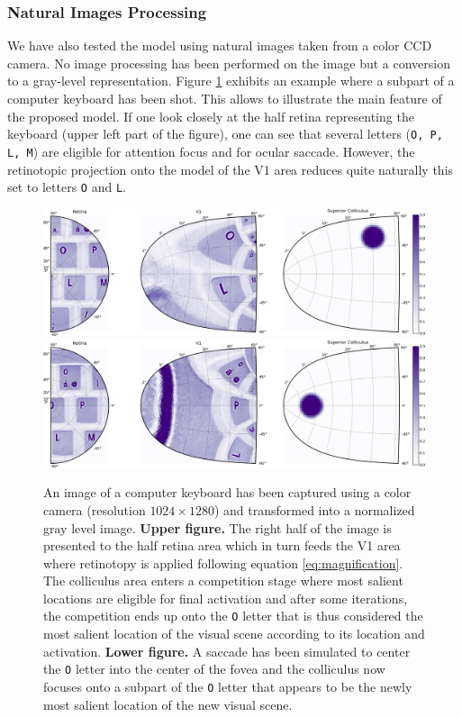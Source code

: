 \subsubsection{Natural Images Processing}
We have also tested the model using natural images taken from a color CCD
camera. No image processing has been performed on the image but a conversion to
a gray-level representation. Figure \ref{fig:colliculus} exhibits an example
where a subpart of a computer keyboard has been shot. This allows to illustrate
the main feature of the proposed model. If one look closely at the half retina
representing the keyboard (upper left part of the figure), one can see that
several letters ({\tt O, P, L, M}) are eligible for attention focus and for
ocular saccade. However, the retinotopic projection onto the model of the V1
area reduces quite naturally this set to letters {\tt O} and {\tt L}.
\begin{figure}
  \centering
    \includegraphics[width=1.0\textwidth]{Chapitres/PublicationsSample/Chapitre/figures/colliculus-1}\\
    \includegraphics[width=1.0\textwidth]{Chapitres/PublicationsSample/Chapitre/figures/colliculus-2}
  \caption{An image of a computer keyboard has been captured using a color
    camera (resolution $1024 \times 1280$) and transformed into a normalized
    gray level image. \textbf{Upper figure.} The right half of the image is
    presented to the half retina area which in turn feeds the V1 area where
    retinotopy is applied following equation \ref{eq:magnification}. The
    colliculus area enters a competition stage where most salient locations are
    eligible for final activation and after some iterations, the competition
    ends up onto the {\tt O} letter that is thus considered the most salient
    location of the visual scene according to its location and
    activation. \textbf{Lower figure.} A saccade has been simulated to center
    the {\tt O} letter into the center of the fovea and the colliculus now
    focuses onto a subpart of the {\tt O} letter that appears to be the newly
    most salient location of the new visual scene.}
  \label{fig:colliculus}
\end{figure}
